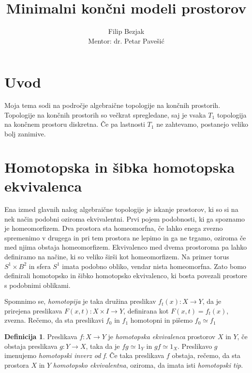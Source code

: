 \documentclass[a4paper,12pt]{article}
\title{Minimalni končni modeli prostorov}
\author{Filip Bezjak \\ Mentor: dr. Petar Pavešić}
\theoremstyle{definition}
\newtheorem{definicija}{Definicija}
\theoremstyle{plain}
\theoremstyle{definition}
\theoremstyle{plain}
\theoremstyle{plain}
\theoremstyle{plain}
\theoremstyle{plain}
\begin{document}
\maketitle

\section{Uvod}
Moja tema sodi na področje algebraične topologije na končnih prostorih. Topologije na končnih prostorih so večkrat spregledane, saj je vsaka $T_1$ topologija
na končnem prostoru diskretna. Če pa lastnosti $T_1$ ne zahtevamo, postanejo veliko bolj
zanimive.

\section{Homotopska in šibka homotopska ekvivalenca}

Ena izmed glavnih nalog algebraične topologije je iskanje prostorov, ki so si 
na nek način podobni oziroma ekvivalentni. Prvi pojem podobnosti, ki ga spoznamo
je homeomorfizem. Dva prostora sta homeomorfna, če lahko enega zvezno spremenimo v drugega in pri tem prostora ne lepimo in ga ne trgamo, oziroma če med njima obstaja homeomorfizem. Ekvivalenco med dvema 
prostoroma pa lahko definiramo na načine, ki so veliko širši kot homeomorfizem.
Na primer torus $S^1\times B^2$ in sfera $S^1$ imata podobno obliko, vendar nista
 homeomorfna. Zato bomo definirali homotopsko in šibko homotopsko ekvivalenco, ki bosta povezali prostore s podobnimi oblikami.

Spomnimo se, \textit{homotopija} je taka družina preslikav $f_t(x):X \rightarrow Y$, da je prirejena preslikava $F(x,t):X \times I \rightarrow Y$, definirana kot $F(x,t)=f_t(x)$, zvezna. Rečemo, da sta preslikavi $f_0$ in $f_1$ homotopni in pišemo $f_0 \simeq f_1$


\begin{definicija}
    Preslikava  $f : X \rightarrow Y$ je \textit{homotopska ekvivalenca} prostorov $X$ in $Y$, če obstaja preslikava $g: Y\rightarrow X$, taka da
    je $f g \simeq 1_Y$ in $gf \simeq 1_X$. Preslikavo $g$ imenujemo \textit{homotopski inverz od f}. Če taka preslikava $f$ obstaja, rečemo, da sta prostora $X$ in
    $Y$  \textit{homotopsko ekvivalentna}, oziroma, da imata isti \textit{homotopski tip}.
\end{definicija}
\end{document}

